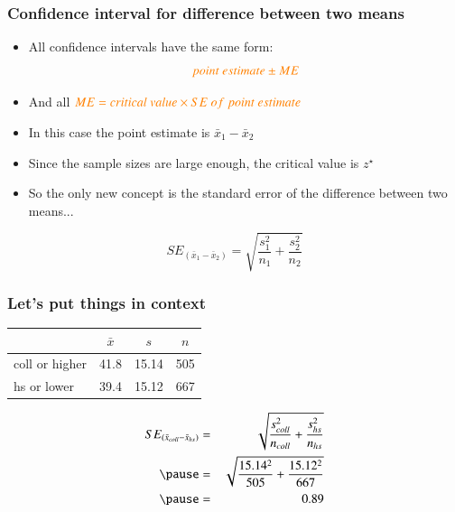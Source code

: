 \begin{frame}
\frametitle{Confidence interval for difference between two means}

\begin{itemize}

\item All confidence intervals have the same form:
\[ \textcolor{orange}{point~estimate \pm ME} \]

\pause

\item And all $ \textcolor{orange}{ME = critical~value \times SE~of~point~estimate}$

\pause

\item In this case the point estimate is $\bar{x}_1 - \bar{x}_2$

\pause

\item Since the sample sizes are large enough, the critical value is $z^\star$

\pause

\item So the only new concept is the standard error of the difference between two means...

\end{itemize}

\pause

{
\[ SE_{(\bar{x}_1 - \bar{x}_2)} = \sqrt{ \frac{s_1^2}{n_1} + \frac{s_2^2}{n_2} } \]
}

\end{frame}


\begin{frame}
\frametitle{Let's put things in context}


{
\begin{tabular}{lccc}
\hline
			& $\bar{x}$ 	& $s$	& $n$ \\
\hline
coll or higher	& 41.8		& 15.14	& 505 \\
hs or lower	& 39.4		& 15.12	& 667 \\
\hline
\end{tabular}
}
{
\pause
\begin{eqnarray*}
SE_{(\bar{x}_{coll} - \bar{x}_{hs})} &=& \sqrt{ \frac{s_{coll}^2}{n_{coll}} + \frac{s_{hs}^2}{n_{hs}} } \\
\pause
&=& \sqrt{ \frac{15.14^2}{505} + \frac{15.12^2}{667} } \\
\pause
&=& 0.89
\end{eqnarray*}
}

\end{frame}

